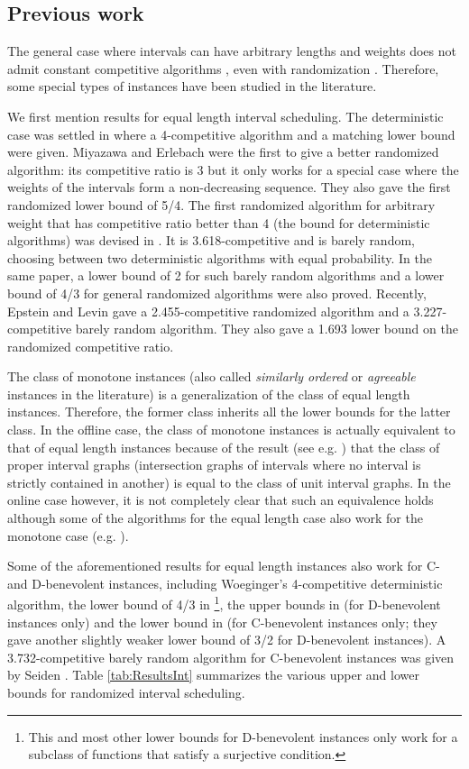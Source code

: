 \documentclass[11pt]{article}
\begin{document}
\subsection{Previous work}

The general case where intervals can have arbitrary lengths and weights
does not admit constant competitive algorithms \cite{Woeg94}, even with 
randomization \cite{CanIra98}.  Therefore, some special types of 
instances have been studied in the literature.

We first mention results for equal length interval scheduling.
The deterministic case was settled in \cite{Woeg94} where a 
4-competitive algorithm and a matching lower bound were given.
Miyazawa and Erlebach \cite{MiyErl04} were the first to give a better
randomized algorithm: its competitive ratio is 3
but it only works for a special case where the weights of the intervals 
form a non-decreasing sequence.
They also gave the first randomized lower bound of 5/4.
The first randomized algorithm for arbitrary weight that
has competitive ratio better than 4 (the bound for deterministic
algorithms) was devised in \cite{FuPoZh07}.
It is 3.618-competitive and is barely random,
choosing between two deterministic algorithms with equal probability.
In the same paper, a lower bound of 2 for such barely random algorithms
and a lower bound of 4/3 for general randomized algorithms
were also proved.
Recently, Epstein and Levin \cite{EpsLev10} 
gave a 2.455-competitive randomized algorithm
and a 3.227-competitive barely random algorithm.
They also gave a 1.693 lower bound on the randomized competitive ratio.

The class of monotone instances (also called {\it similarly ordered}
\cite{CJST07} or {\it agreeable} \cite{LiSS05} instances in the literature)
is a generalization of the class of equal length instances.
Therefore, the former class inherits all the lower bounds for the latter
class.
In the offline case, the class of monotone instances is actually
equivalent to that of equal length instances
because of the result (see e.g. \cite{BogWes99})
that the class of proper interval graphs 
(intersection graphs of intervals where no interval is
strictly contained in another)
is equal to the class of unit interval graphs.
In the online case however, it is not completely clear that 
such an equivalence holds although some of the algorithms 
for the equal length case also work for the monotone case
(e.g. \cite{MiyErl04,FuPoZh07,EpsLev10}).

Some of the aforementioned results for equal length instances also
work for C- and D-benevolent instances, including
Woeginger's 4-competitive deterministic algorithm,
the lower bound of 4/3 in \cite{FuPoZh07}\footnote{
This and most other lower bounds for D-benevolent instances
only work for a subclass of functions that satisfy a surjective
condition.},
the upper bounds in \cite{EpsLev10} (for D-benevolent instances only)
and the lower bound in \cite{EpsLev10} (for C-benevolent instances only;
they gave another slightly weaker lower bound of 3/2 for D-benevolent
instances).
A 3.732-competitive barely random algorithm
for C-benevolent instances was given by Seiden \cite{Sei98}.  
Table \ref{tab:ResultsInt} summarizes the various upper and lower bounds
for randomized interval scheduling.
\end{document}
